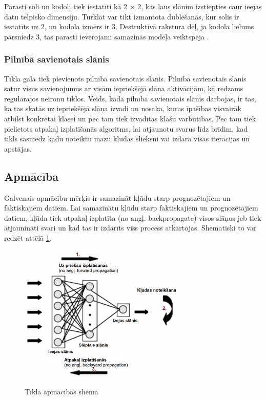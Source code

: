 \documentclass[12pt,paper=A4]{report}
\begin{document}
    Parasti soļi un kodoli tiek iestatīti kā 2 × 2, kas ļaus slānim izstiepties caur ieejas datu telpisko dimensiju. Turklāt var tikt izmantota dublēšanās, kur solis ir iestatīts uz 2, un kodola izmērs ir 3. Destruktīvā rakstura dēļ, ja kodola lielums pārsniedz 3, tas parasti ievērojami samazinās modeļa veiktspēja
     \cite{cnnArhVIZRec}. 
     
\subsubsection{Pilnībā savienotais slānis}     

Tīkla galā tiek pievienots pilnībā savienotais slānis. Pilnībā savienotais slānis satur visus savienojumus ar visām iepriekšējā slāņa aktivācijām, kā redzams regulārajos neironu tīklos. Veids, kādā pilnībā savienotais slānis darbojas, ir tas, ka tas skatās uz iepriekšējā slāņa izvadi un nosaka, kuras īpašības visvairāk atbilst konkrētai klasei un pēc tam tiek izvadītas klašu varbūtības. Pēc tam tiek pielietots atpakaļ izplatīšanās algoritms, lai atjaunotu svarus līdz brīdim, kad tīkls sasniedz kādu noteiktu mazu kļūdas slieksni vai izdara visas iterācijas un apstājas. 

\subsection{Apmācība}

Galvenais apmācību mērķis ir samazināt kļūdu starp prognozētajiem un faktiskajiem datiem. Lai samazinātu kļūdu starp faktiskajiem un prognozētajiem datiem, kļūda tiek atpakaļ izplatīta (no angļ. backpropagate) visos slāņos jeb tiek atjaunināti svari un kad tas ir izdarīts viss process atkārtojas. Shematiski to var redzēt attēlā \ref{propogar}. 

\begin{figure}[H] \centering
\includegraphics[width=0.70\textwidth]{backpropogateReview} 
\caption{Tīkla apmācības shēma} 
\cite{https://medium.com/coinmonks/backpropagation-concept-explained-in-5-levels-of-difficulty-8b220a939db5}  \label{propogar} 
\end{figure}
\end{document}
